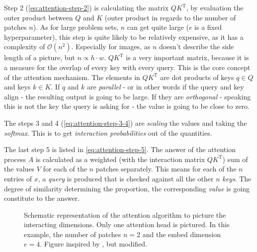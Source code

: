 Step 2 (\autoref{eq:attention-step-2}) is calculating the matrix $QK^\mathrm{T}$, by evaluation the \glqq outer product\grqq{} between $Q$ and $K$ (outer product in regards to the number of patches $n$).
As for large problem sets, $n$ can get quite large ($e$ is a fixed hyperparameter), this step is quite likely to be relatively expensive, as it has a complexity of $\mathcal{O}(n^2)$.
Especially for images, as $n$ doesn't describe the side length of a picture, but $n \propto h \cdot w$.
$QK^\mathrm{T}$ is a very important matrix, because it is a measure for the \glqq overlap\grqq{} of every key with every query. 
This is the core concept of the attention mechanism. 
The elements in $QK^\mathrm{T}$ are dot products of keys $q \in Q$ and keys $k \in K$. If $q$ and $k$ are \emph{parallel} - or in other words if the query and key align - the resulting output is going to be large.
If they are \emph{orthogonal} - speaking this is not the key the query is asking for - the value is going to be close to zero.

The steps 3 and 4 (\autoref{eq:attention-step-3-4}) are \emph{scaling} the values and taking the \emph{softmax}. 
This is to get \emph{interaction probabilities} out of the quantities.

The last step 5 is listed in \autoref{eq:attention-step-5}.
The answer of the attention process $A$ is calculated as a weighted (with the interaction matrix $QK^\mathrm{T}$) sum of the values $V$ for each of the $n$ patches separately. 
This means for each of the $n$ entries of $x$, a \emph{query} is produced that is checked against all the other $n$ \emph{keys}. 
The degree of similarity determining the proportion, the corresponding \emph{value} is going constitute to the answer.

\begin{figure}[htbp]
    \centering
    \caption{Schematic representation of the attention algorithm to picture the interacting dimensions.
            Only one attention head is pictured.
            In this example, the number of patches $n=2$ and the embed dimension $e=4$.
            Figure inspired by \cite{attentionVisualizationDimensionality}, but modified.
            }
    \label{fig:attention-visualization}
\end{figure}

